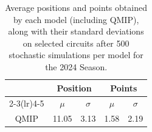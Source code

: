 \begin{table}[H]
\centering
\begin{tabular}{ccccc}
\toprule
\multicolumn{1}{l}{}               & \multicolumn{2}{c}{Position}   & \multicolumn{2}{c}{Points} \\ \cmidrule(lr){2-3}\cmidrule(lr){4-5}
\multicolumn{1}{c}{Model}          &    $\mu$ & $\sigma$ &   $\mu$  & $\sigma$ \\ \midrule
\multicolumn{1}{c}{QMIP          } &    11.05  &     3.13  &     1.58  &     2.19  \\
\bottomrule
\end{tabular}
\caption{Average positions and points obtained by each model (including QMIP), along with their standard deviations on selected circuits after 500 stochastic simulations per model for the 2024 Season.}
\label{tab:tab_qmip_vs_drl_stochastic_2024}
\end{table}